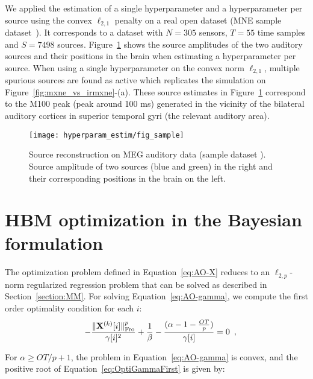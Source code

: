We applied the estimation of a single hyperparameter and a hyperparameter per source using the convex $\ell_{2,1}$ penalty on a real open dataset (MNE sample dataset~\cite{MNE}). It corresponds to a dataset with $N=305$ sensors, $T=55$ time samples and $S=7498$ sources. 
Figure~\ref{fig:sample_data} shows the source amplitudes of the two auditory sources and their positions in the brain when estimating a hyperparameter per source. When using a single hyperparameter on the convex norm $\ell_{2,1}$, multiple spurious sources are found as active which replicates the simulation on Figure~\ref{fig:mxne_vs_irmxne}-(a). These source estimates in Figure~\ref{fig:sample_data} correspond to the M100 peak (peak around 100 ms) generated in the vicinity of the bilateral auditory cortices in superior temporal gyri (the relevant auditory area).

\begin{figure}
\texttt{[image: hyperparam\_estim/fig\_sample]}
    \caption{Source reconstruction on MEG auditory data (sample dataset \cite{MNE}). Source amplitude of two sources (blue and green) in the right and their corresponding positions in the brain on the left. 
    }
    \label{fig:sample_data}
\end{figure}


\section{HBM optimization in the Bayesian formulation}
\label{section:hbm_optim}

The optimization problem defined in Equation~\eqref{eq:AO-X} reduces to an $\ell_{2,p}$-norm regularized regression problem that can be solved as described in Section~\ref{section:MM}. For solving Equation~\eqref{eq:AO-gamma}, we compute the first order optimality condition for each $i$:
\begin{eqnarray}
\label{eq:OptiGamma}
\qquad - \frac{\fronorm{\bfX^{(k)}[i]}^p}{\mathbf{\gamma}[i]^2} + \frac{1}{\beta} - \frac{( \alpha - 1 - \frac{OT}{p})}{\mathbf{\gamma}[i]} &= 0 \enspace,\label{eq:OptiGammaFirst}%
\end{eqnarray}

For $\alpha \geqslant O T/p + 1$, the problem in Equation~\eqref{eq:AO-gamma} is convex, and the positive root of Equation~\eqref{eq:OptiGammaFirst} is given by:

